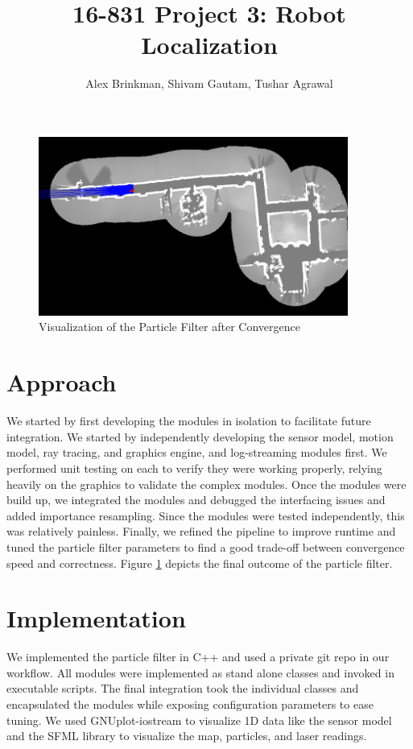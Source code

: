 \documentclass{article}
\begin{document}
\title{16-831 Project 3: Robot Localization}
\author{Alex Brinkman, Shivam Gautam, Tushar Agrawal}
\maketitle

\begin{figure}[!h]
    \centering
    \includegraphics[width=4.0in]{media/graphics_example.png}
    \caption{Visualization of the Particle Filter after Convergence}
\label{fig:1}
\end{figure}

\section{Approach}
    We started by first developing the modules in isolation to facilitate future integration. We started by independently developing the sensor model, motion model, ray tracing, and graphics engine, and log-streaming modules first. We performed unit testing on each to verify they were working properly, relying heavily on the graphics to validate the complex modules. Once the modules were build up, we integrated the modules and debugged the interfacing issues and added importance resampling. Since the modules were tested independently, this was relatively painless. Finally, we refined the pipeline to improve runtime and tuned the particle filter parameters to find a good trade-off between convergence speed and correctness. Figure \ref{fig:1} depicts the final outcome of the particle filter.

\section{Implementation}
    We implemented the particle filter in C++ and used a private git repo in our workflow.  All modules were implemented as stand alone classes and invoked in executable scripts.  The final integration took the individual classes and encapsulated the modules while exposing configuration parameters to ease tuning. We used GNUplot-iostream to visualize 1D data like the sensor model and the SFML library to visualize the map, particles, and laser readings.  
\end{document}
